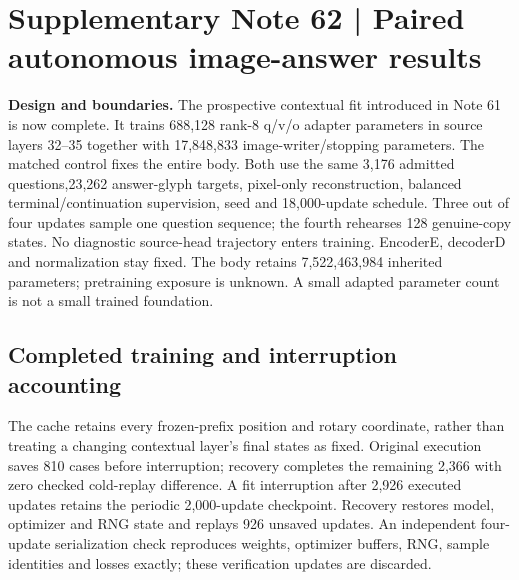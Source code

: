 \documentclass[10pt,a4paper]{article}
\providecommand{\DIFadd}[1]{{\protect\color{blue} \sf #1}} %
\begin{document}
\clearpage
{}


\clearpage
\section*{\DIFadd{Supplementary Note 62 | Paired autonomous image-answer results}}

\DIFadd{\textbf{Design and boundaries.}
The prospective contextual fit introduced in Note 61 is now complete. It
trains 688,128 rank-8 q/v/o adapter parameters in source layers 32--35 together
with 17,848,833 image-writer/stopping parameters. The matched control fixes the
entire body. Both use the same 3,176 admitted questions,23,262 answer-glyph
targets, pixel-only reconstruction, balanced terminal/continuation supervision,
seed and 18,000-update schedule. Three out of four updates sample one question
sequence; the fourth rehearses 128 genuine-copy states. No diagnostic source-head
trajectory enters training. EncoderE, decoderD and normalization stay fixed.
The body retains 7,522,463,984 inherited parameters; pretraining exposure is
unknown. A small adapted parameter count is not a small trained foundation.
}

\subsection*{\DIFadd{Completed training and interruption accounting}}
\DIFadd{The cache retains every frozen-prefix position and rotary coordinate, rather
than treating a changing contextual layer's final states as fixed. Original
execution saves 810 cases before interruption; recovery completes the remaining
2,366 with zero checked cold-replay difference. A fit interruption after 2,926
executed updates retains the periodic 2,000-update checkpoint. Recovery restores
model, optimizer and RNG state and replays 926 unsaved updates. An independent
four-update serialization check reproduces weights, optimizer buffers, RNG,
sample identities and losses exactly; these verification updates are discarded.
}
\end{document}
